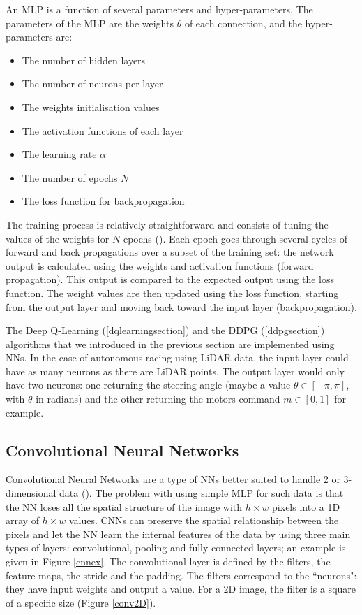 An MLP is a function of several parameters and hyper-parameters. The parameters of the MLP are the weights $\theta$ of each connection, and the hyper-parameters are:
\begin{itemize}
	\item The number of hidden layers
	\item The number of neurons per layer
	\item The weights initialisation values
	\item The activation functions of each layer
	\item The learning rate $\alpha$
	\item The number of epochs $N$
	\item The loss function for backpropagation
\end{itemize}

The training process is relatively straightforward and consists of tuning the values of the weights for $N$ epochs (\cite{mlptraining}). Each epoch goes through several cycles of forward and back propagations over a subset of the training set: the network output is calculated using the weights and activation functions (forward propagation). This output is compared to the expected output using the loss function. The weight values are then updated using the loss function, starting from the output layer and moving back toward the input layer (backpropagation).


The Deep Q-Learning (\ref{dqlearningsection}) and the DDPG (\ref{ddpgsection}) algorithms that we introduced in the previous section are implemented using NNs. In the case of autonomous racing using LiDAR data, the input layer could have as many neurons as there are LiDAR points. The output layer would only have two neurons: one returning the steering angle (maybe a value $\theta \in [-\pi,\pi]$, with $\theta$ in radians) and the other returning the motors command $m \in [0,1]$ for example.


\subsection{Convolutional Neural Networks}

Convolutional Neural Networks are a type of NNs better suited to handle 2 or 3-dimensional data (\cite{cnnintro}). The problem with using simple MLP for such data is that the NN loses all the spatial structure of the image with $h \times w$ pixels into a 1D array of $h \times w$ values. CNNs can preserve the spatial relationship between the pixels and let the NN learn the internal features of the data by using three main types of layers: convolutional, pooling and fully connected layers; an example is given in Figure \ref{cnnex}. \newline
The convolutional layer is defined by the filters, the feature maps, the stride and the padding. The filters correspond to the ``neurons": they have input weights and output a value. For a 2D image, the filter is a square of a specific size (Figure \ref{conv2D}).

